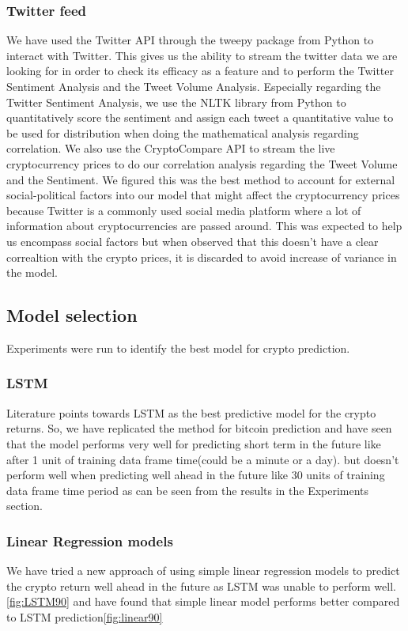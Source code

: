 \documentclass[final]{cvpr}
\begin{document}
\subsubsection{Twitter feed}
We have used the Twitter API through the tweepy package from Python to interact with Twitter. This gives us the ability to stream the twitter data we are looking for in order to check its efficacy as a feature and to perform the Twitter Sentiment Analysis and the Tweet Volume Analysis. Especially regarding the Twitter Sentiment Analysis, we use the NLTK library from Python to quantitatively score the sentiment and assign each tweet a quantitative value to be used for distribution when doing the mathematical analysis regarding correlation. We also use the CryptoCompare API to stream the live cryptocurrency prices to do our correlation analysis regarding the Tweet Volume and the Sentiment. We figured this was the best method to account for external social-political factors into our model that might affect the cryptocurrency prices because Twitter is a commonly used social media platform where a lot of information about cryptocurrencies are passed around. This was expected to help us encompass social factors but when observed that this doesn't have a clear correaltion with the crypto prices, it is discarded to avoid increase of variance in the model.

\subsection{Model selection}
Experiments were run to identify the best model for crypto prediction.
\subsubsection{LSTM}
Literature points towards LSTM as the best predictive model for the crypto returns. So, we have replicated the method for bitcoin prediction and have seen that the model performs very well for predicting short term in the future like after 1 unit of training data frame time(could be a minute or a day). but doesn't perform well when predicting well ahead in the future like 30 units of training data frame time period as can be seen from the results in the Experiments section.
\subsubsection{Linear Regression models}
 We have tried a new approach of using simple linear regression models to predict the crypto return well ahead in the future as LSTM was unable to perform well.\ref{fig:LSTM90} and have found that simple linear model performs better compared to LSTM prediction\ref{fig:linear90}
 
\end{document}
